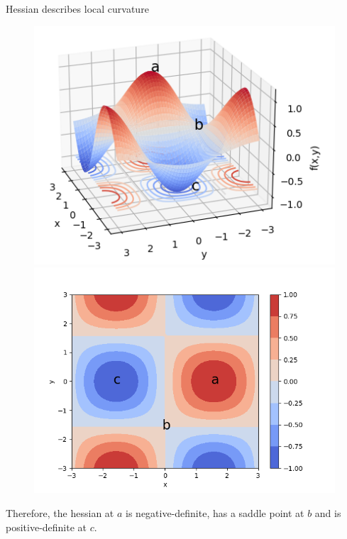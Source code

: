 \begin{vbframe}{Hessian describes local curvature}
\begin{figure}[!tbp]
  \centering
  \begin{minipage}[b]{0.4\textwidth}
    \includegraphics[width=\textwidth]{figure_man/hessian_3d.png}
  \end{minipage}
  \hfill
  \begin{minipage}[b]{0.4\textwidth}
    \includegraphics[width=\textwidth]{figure_man/hessian_contour.png}
  \end{minipage}
\end{figure} 
\begin{footnotesize}
Therefore, the hessian at $a$ is negative-definite, has a saddle point at $b$ and is positive-definite at $c$.
\end{footnotesize}

\end{vbframe}
\framebreak 

